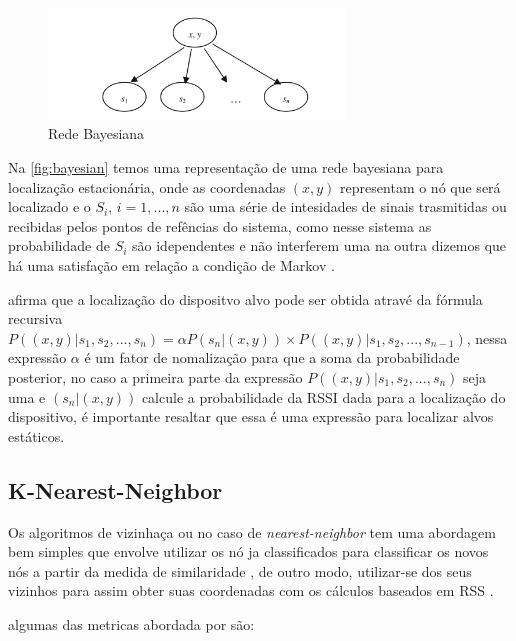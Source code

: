     \begin{figure}[H]
              \caption{\label{fig:bayesian}{Rede Bayesiana}}
              \centering
              \includegraphics[width=0.7\textwidth]{Figuras/bayesian_network.PNG}
        \end{figure}

        Na \autoref{fig:bayesian} temos uma representação de uma rede bayesiana para localização estacionária, onde as coordenadas $(x,y)$ representam o nó que será localizado e o $S_i$, $i=1,...,n$ são uma série de intesidades de sinais trasmitidas ou recibidas pelos pontos de refências do sistema, como nesse sistema as probabilidade de $S_i$ são idependentes e não interferem uma na outra dizemos que há uma satisfação em relação a condição de Markov \cite{rfid2009review}.
        \par
        \citeauthor{rfid2009review} afirma que a localização do dispositvo alvo pode ser obtida atravé da fórmula recursiva 
        $P((x,y) | s_1, s_2, ..., s_n) = \alpha P(s_n | (x,y)) \times P((x,y) | s_1,s_2, ...,s_{n-1})$, nessa expressão $\alpha$ é um fator de nomalização para que a soma da probabilidade posterior, no caso a primeira parte da expressão $P((x,y) | s_1, s_2, ..., s_n)$ seja uma e $(s_n | (x,y))$ calcule a probabilidade da RSSI dada para a localização do dispositivo, é importante resaltar que essa é uma expressão para localizar alvos estáticos. 
        
    \subsection{K-Nearest-Neighbor}
    Os algoritmos de vizinhaça ou no caso de \textit{nearest-neighbor} tem uma abordagem bem simples que envolve utilizar os nó ja classificados para classificar os novos nós a partir da medida de similaridade \cite{knn-3dLAN}, de outro modo, utilizar-se dos seus vizinhos para assim obter suas coordenadas com os cálculos baseados em RSS \cite{rfid2009review}.

    \par
    algumas das metricas abordada por \citeauthor{knn-3dLAN} são:

